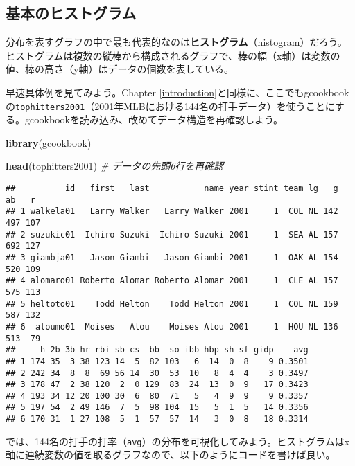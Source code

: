 \documentclass[]{book}
\newenvironment{Shaded}{\begin{snugshade}}{\end{snugshade}}
\newcommand{\KeywordTok}[1]{\textcolor[rgb]{0.13,0.29,0.53}{\textbf{#1}}}
\newcommand{\CommentTok}[1]{\textcolor[rgb]{0.56,0.35,0.01}{\textit{#1}}}
\newcommand{\NormalTok}[1]{#1}
\begin{document}
\subsection{基本のヒストグラム}

分布を表すグラフの中で最も代表的なのは\textbf{ヒストグラム}（histogram）だろう。ヒストグラムは複数の縦棒から構成されるグラフで、棒の幅（x軸）は変数の値、棒の高さ（y軸）はデータの個数を表している。

早速具体例を見てみよう。Chapter
\ref{introduction}と同様に、ここでもgcookbookの\texttt{tophitters2001}（2001年MLBにおける144名の打手データ）を使うことにする。gcookbookを読み込み、改めてデータ構造を再確認しよう。

\begin{Shaded}
\begin{Highlighting}[]
\KeywordTok{library}\NormalTok{(gcookbook)}
\end{Highlighting}
\end{Shaded}

\begin{Shaded}
\begin{Highlighting}[]
\KeywordTok{head}\NormalTok{(tophitters2001) }\CommentTok{# データの先頭6行を再確認}
\end{Highlighting}
\end{Shaded}

\begin{verbatim}
##          id   first   last           name year stint team lg   g  ab   r
## 1 walkela01   Larry Walker   Larry Walker 2001     1  COL NL 142 497 107
## 2 suzukic01  Ichiro Suzuki  Ichiro Suzuki 2001     1  SEA AL 157 692 127
## 3 giambja01   Jason Giambi   Jason Giambi 2001     1  OAK AL 154 520 109
## 4 alomaro01 Roberto Alomar Roberto Alomar 2001     1  CLE AL 157 575 113
## 5 heltoto01    Todd Helton    Todd Helton 2001     1  COL NL 159 587 132
## 6  aloumo01  Moises   Alou    Moises Alou 2001     1  HOU NL 136 513  79
##     h 2b 3b hr rbi sb cs  bb  so ibb hbp sh sf gidp    avg
## 1 174 35  3 38 123 14  5  82 103   6  14  0  8    9 0.3501
## 2 242 34  8  8  69 56 14  30  53  10   8  4  4    3 0.3497
## 3 178 47  2 38 120  2  0 129  83  24  13  0  9   17 0.3423
## 4 193 34 12 20 100 30  6  80  71   5   4  9  9    9 0.3357
## 5 197 54  2 49 146  7  5  98 104  15   5  1  5   14 0.3356
## 6 170 31  1 27 108  5  1  57  57  14   3  0  8   18 0.3314
\end{verbatim}

では、144名の打手の打率（\texttt{avg}）の分布を可視化してみよう。ヒストグラムはx軸に連続変数の値を取るグラフなので、以下のようにコードを書けば良い。
\end{document}
